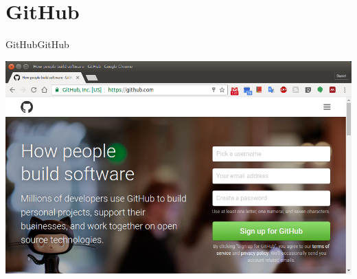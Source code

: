 \documentclass[10pt,compress]{beamer} %
\begin{document}

\section{GitHub}
\begin{frame}{GitHub}{GitHub}

\centering
\includegraphics[width=\textwidth,height=\textheight,keepaspectratio]{figs/github.png}


\end{frame}


% 
% 


\end{document}
